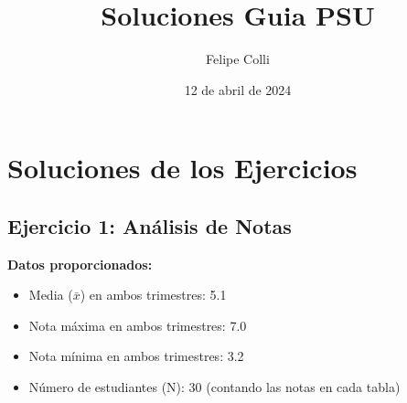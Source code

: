 \documentclass[10pt, a4paper]{article}
\title{Soluciones Guia PSU}
\author{Felipe Colli}
\date{12 de abril de 2024}
\newcommand{\mean}[1]{\ensuremath{\bar{#1}}} %
\begin{document}
\maketitle

\section*{Soluciones de los Ejercicios}

\subsection*{Ejercicio 1: Análisis de Notas}
\textbf{Datos proporcionados:}
\begin{itemize}[nosep]
    \item Media (\mean{x}) en ambos trimestres: \num{5,1}
    \item Nota máxima en ambos trimestres: \num{7,0}
    \item Nota mínima en ambos trimestres: \num{3,2}
    \item Número de estudiantes (N): 30 (contando las notas en cada tabla)
\end{itemize}
\end{document}

